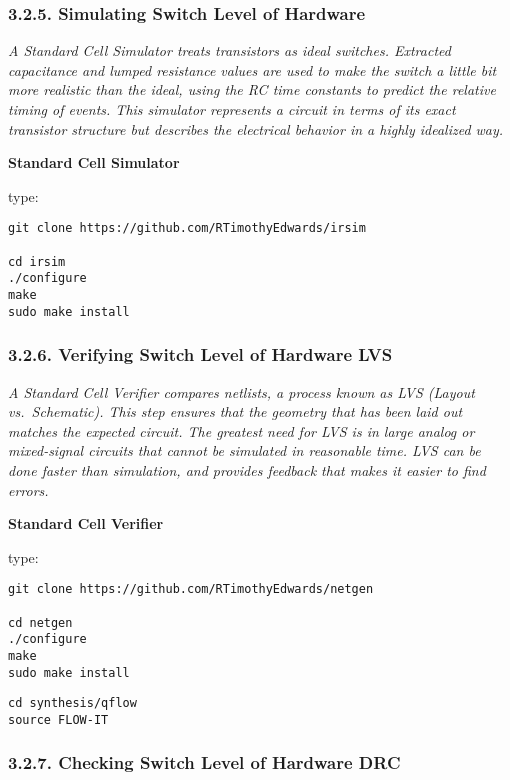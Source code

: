 \documentclass[]{article}
\begin{document}
\subsubsection{3.2.5. Simulating Switch Level of
Hardware}\label{simulating-switch-level-of-hardware}

\emph{A Standard Cell Simulator treats transistors as ideal switches.
Extracted capacitance and lumped resistance values are used to make the
switch a little bit more realistic than the ideal, using the RC time
constants to predict the relative timing of events. This simulator
represents a circuit in terms of its exact transistor structure but
describes the electrical behavior in a highly idealized way.}

\textbf{Standard Cell Simulator}

type:

\begin{verbatim}
git clone https://github.com/RTimothyEdwards/irsim

cd irsim
./configure
make
sudo make install
\end{verbatim}

\subsubsection{3.2.6. Verifying Switch Level of Hardware
LVS}\label{verifying-switch-level-of-hardware-lvs}

\emph{A Standard Cell Verifier compares netlists, a process known as LVS
(Layout vs.~Schematic). This step ensures that the geometry that has
been laid out matches the expected circuit. The greatest need for LVS is
in large analog or mixed-signal circuits that cannot be simulated in
reasonable time. LVS can be done faster than simulation, and provides
feedback that makes it easier to find errors.}

\textbf{Standard Cell Verifier}

type:

\begin{verbatim}
git clone https://github.com/RTimothyEdwards/netgen

cd netgen
./configure
make
sudo make install
\end{verbatim}

\begin{verbatim}
cd synthesis/qflow
source FLOW-IT
\end{verbatim}

\subsubsection{3.2.7. Checking Switch Level of Hardware
DRC}\label{checking-switch-level-of-hardware-drc}
\end{document}
